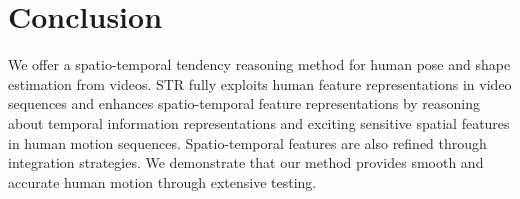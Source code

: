 \documentclass{bmvc2k}
\begin{document}
\begin{table}[ht]

\centering
{}
\caption{Effects of the network designs on the performance on the MPI-INF-3DHP dataset.}\label{tab:tab2}
\end{table}

































\section{Conclusion}
\label{sec:Conclusion}
We offer a spatio-temporal tendency reasoning method for human pose and shape estimation from videos. STR fully exploits human feature representations in video sequences and enhances spatio-temporal feature representations by reasoning about temporal information representations and exciting sensitive spatial features in human motion sequences. Spatio-temporal features are also refined through integration strategies. We demonstrate that our method provides smooth and accurate human motion through extensive testing.
\end{document}
